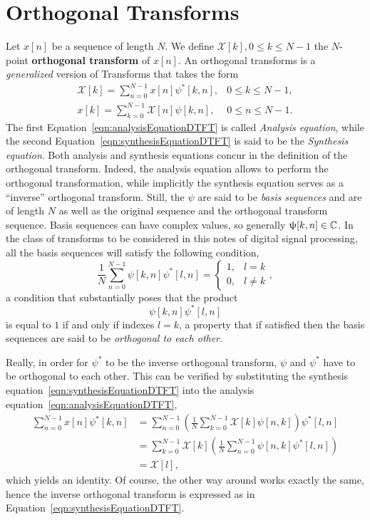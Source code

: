 \documentclass[\documentfontsize, twocolumn]{\classname}
\begin{document}
\section{Orthogonal Transforms}\label{sec:orthogonalTransforms}

Let $x[n]$ be a sequence of length $N$. We define $\mathcal X[k], 0 \leq k \leq N-1$ the $N$-point \textbf{orthogonal transform} of $x[n]$. An orthogonal transforms is a \emph{generalized} version of Transforms that takes the form
\begin{eqnarray}
    \mathcal X[k] = \sum_{n=0}^{N-1} x[n] \psi^*[k,n], & 0 \leq k \leq N-1, \\\label{eqn:analysisEquationDTFT}
    x[k] = \sum_{k=0}^{N-1} \mathcal X[n] \psi[k,n], & 0 \leq n \leq N-1. \label{eqn:synthesisEquationDTFT}
\end{eqnarray}
The first Equation~\ref{eqn:analysisEquationDTFT} is called \emph{Analysis equation}, while the second Equation~\ref{eqn:synthesisEquationDTFT} is said to be the \emph{Synthesis equation}. Both analysis and synthesis equations concur in the definition of the orthogonal transform. Indeed, the analysis equation allows to perform the orthogonal transformation, while implicitly the synthesis equation serves as a ``inverse'' orthogonal transform. Still, the $\psi$ are said to be \emph{basis sequences} and are of length $N$ as well as the original sequence and the orthogonal transform sequence. Basis sequences can have complex values, so generally $\uppsi[k, n] \in \mathbb C$. In the class of transforms to be considered in this notes of digital signal processing, all the basis sequences will satisfy the following condition,
\begin{equation}\label{eqn:orthogonalTransformsOrthogonalityCondition}
    \frac 1 N \sum_{n=0}^{N-1} \psi[k,n]\psi^*[l,n] = \left\{\begin{array}{ll}1, & l = k\\ 0, & l \neq k\end{array}\right.,
\end{equation}
a condition that substantially poses that the product \[\psi[k,n]\psi^*[l,n]\] is equal to $1$ if and only if indexes $l = k$, a property that if satisfied then the basis sequences are said to be \emph{orthogonal to each other}.

Really, in order for $\psi^*$ to be the inverse orthogonal transform, $\psi$ and $\psi^*$ have to be orthogonal to each other. This can be verified by substituting the synthesis equation~\ref{eqn:synthesisEquationDTFT} into the analysis equation~\ref{eqn:analysisEquationDTFT},
\begin{align*}
    \sum_{n=0}^{N-1} x[n] \psi^*[k,n] &= \sum_{n=0}^{N-1}\left( \frac 1 N \sum_{k=0}^{N-1} \mathcal X[k] \psi[n,k]\right)\psi^*[l,n] \\
                                      &= \sum_{k=0}^{N-1} \mathcal X[k] \left( \frac 1 N \sum_{n=0}^{N-1}\psi[n,k]\psi^*[l,n]\right) \\
                                      &= \mathcal X[l],
\end{align*}
which yields an identity. Of course, the other way around works exactly the same, hence the inverse orthogonal transform is expressed as in Equation~\ref{eqn:synthesisEquationDTFT}.
\end{document}
